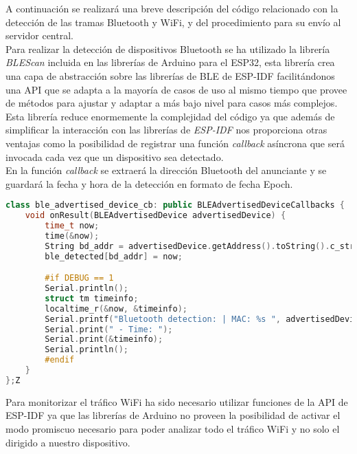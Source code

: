\documentclass[../proyecto.tex]{subfiles}
\begin{document}
A continuación se realizará una breve descripción del código relacionado con la detección de las tramas Bluetooth y WiFi, y del procedimiento para su envío al servidor central.\\

Para realizar la detección de dispositivos Bluetooth se ha utilizado la librería \textit{BLEScan} incluida en las librerías de Arduino para el ESP32, esta librería crea una capa de abstracción sobre las librerías de BLE de ESP-IDF facilitándonos una API que se adapta a la mayoría de casos de uso al mismo tiempo que provee de métodos para ajustar y adaptar a más bajo nivel para casos más complejos.\\

Esta librería reduce enormemente la complejidad del código ya que además de simplificar la interacción con las librerías de \textit{ESP-IDF} nos proporciona otras ventajas como la posibilidad de registrar una función \textit{callback} asíncrona que será invocada cada vez que un dispositivo sea detectado.\\

En la función \textit{callback} se extraerá la dirección Bluetooth del anunciante y se guardará la fecha y hora de la detección en formato de fecha Epoch.\\

\begin{minipage}{\linewidth}
\begin{lstlisting}[language=C++, caption=Función \textit{callback} para el escaneo BLE, captionpos=b, frame=single]
class ble_advertised_device_cb: public BLEAdvertisedDeviceCallbacks {
    void onResult(BLEAdvertisedDevice advertisedDevice) {
        time_t now;
        time(&now);
        String bd_addr = advertisedDevice.getAddress().toString().c_str();
        ble_detected[bd_addr] = now;

        #if DEBUG == 1
        Serial.println();
        struct tm timeinfo;
        localtime_r(&now, &timeinfo);
        Serial.printf("Bluetooth detection: | MAC: %s ", advertisedDevice.getAddress().toString().c_str());
        Serial.print(" - Time: ");
        Serial.print(&timeinfo);
        Serial.println();
        #endif
    }
};Z
\end{lstlisting}
\end{minipage}

Para monitorizar el tráfico WiFi ha sido necesario utilizar funciones de la API de ESP-IDF ya que las librerías de Arduino no proveen la posibilidad de activar el modo promiscuo necesario para poder analizar todo el tráfico WiFi y no solo el dirigido a nuestro dispositivo.\\
\end{document}
